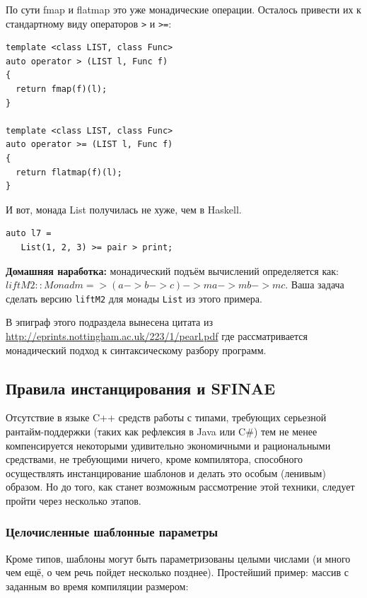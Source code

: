 \documentclass[a4paper,12pt,oneside]{article}
\begin{document}
По сути fmap и flatmap это уже монадические операции. Осталось привести их к стандартному виду операторов \lstinline!>! и \lstinline!>=!:

\begin{lstlisting}
template <class LIST, class Func>
auto operator > (LIST l, Func f)
{
  return fmap(f)(l);   
}
 
template <class LIST, class Func>
auto operator >= (LIST l, Func f)
{
  return flatmap(f)(l);   
}
\end{lstlisting}

И вот, монада List получилась не хуже, чем в Haskell.

\begin{lstlisting}
auto l7 = 
   List(1, 2, 3) >= pair > print;
\end{lstlisting}

\textbf{Домашняя наработка:} монадический подъём вычислений определяется как:
$liftM2 :: Monad m => (a -> b -> c) -> m a -> m b -> m c$.
Ваша задача сделать версию \lstinline!liftM2! для монады \lstinline!List! из этого примера.

В эпиграф этого подраздела вынесена цитата из \url{http://eprints.nottingham.ac.uk/223/1/pearl.pdf} где рассматривается монадический подход к синтаксическому разбору программ.

\pagebreak
\subsection{Правила инстанцирования и SFINAE}\label{SFINAESection}

Отсутствие в языке C++ средств работы с типами, требующих серьезной рантайм-поддержки (таких как рефлексия в Java или C\#) тем не менее компенсируется некоторыми удивительно экономичными и рациональными средствами, не требующими ничего, кроме компилятора, способного осуществлять инстанцирование шаблонов и делать это особым (ленивым) образом. Но до того, как станет возможным рассмотрение этой техники, следует пройти через несколько этапов.

\subsubsection{Целочисленные шаблонные параметры}\label{IntegerTParam}

Кроме типов, шаблоны могут быть параметризованы целыми числами (и много чем ещё, о чем речь пойдет несколько позднее). Простейший пример: массив с заданным во время компиляции размером:
\end{document}
